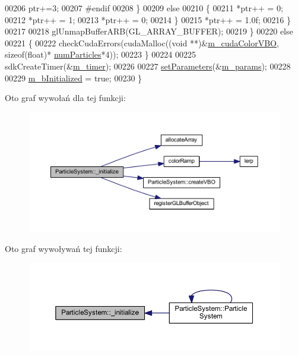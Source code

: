 \begin{DoxyCode}
00206             ptr+=3;
00207 \textcolor{preprocessor}{#endif}
00208 \textcolor{preprocessor}{}                        \}
00209                         \textcolor{keywordflow}{else}
00210                         \{
00211                                 *ptr++ = 0;
00212                                 *ptr++ = 1;
00213                                 *ptr++ = 0;
00214                         \}
00215             *ptr++ = 1.0f;
00216         \}
00217 
00218         glUnmapBufferARB(GL\_ARRAY\_BUFFER);
00219     \}
00220     \textcolor{keywordflow}{else}
00221     \{
00222         checkCudaErrors(cudaMalloc((\textcolor{keywordtype}{void} **)&\hyperlink{class_particle_system_a39d210b57da5f7f4a2c23f4fc0b43ea1}{m\_cudaColorVBO}, \textcolor{keyword}{sizeof}(\textcolor{keywordtype}{float})*
      \hyperlink{particles_8cpp_a05b8a90212054a3eb1a036ae0c269596}{numParticles}*4));
00223     \}
00224 
00225     sdkCreateTimer(&\hyperlink{class_particle_system_af01e546384ef27bb1894a37f2a02e967}{m\_timer});
00226 
00227     \hyperlink{particle_system_8cuh_a342176dbaba2668312c45e1a1423fc4e}{setParameters}(&\hyperlink{class_particle_system_ab765472aed6a1b5f0d2f98a3a906c417}{m\_params});
00228 
00229     \hyperlink{class_particle_system_a21bbfba9d8701a70bc6fddbf4fc3f5bd}{m\_bInitialized} = \textcolor{keyword}{true};
00230 \}
\end{DoxyCode}


Oto graf wywołań dla tej funkcji\-:\nopagebreak
\begin{figure}[H]
\begin{center}
\leavevmode
\includegraphics[width=350pt]{class_particle_system_a484988642e046424d32a13709204e8de_cgraph}
\end{center}
\end{figure}




Oto graf wywoływań tej funkcji\-:\nopagebreak
\begin{figure}[H]
\begin{center}
\leavevmode
\includegraphics[width=350pt]{class_particle_system_a484988642e046424d32a13709204e8de_icgraph}
\end{center}
\end{figure}


